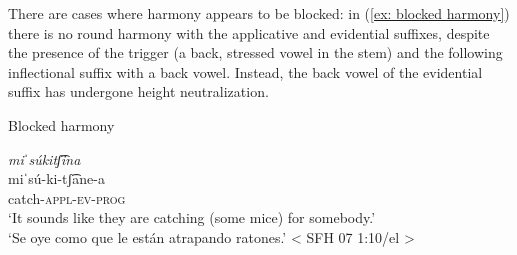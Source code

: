                 \label{ex: round harmony in derived stem and syntactic stemd}
                    \label{ex: round harmony in derived stem and syntactic steme}
    \z
\z

There are cases where harmony appears to be blocked: in (\ref{ex: blocked harmony}) there is no round harmony with the applicative and evidential suffixes, despite the presence of the trigger (a back, stressed vowel in the stem) and the following inflectional suffix with a back vowel. Instead, the back vowel of the evidential suffix has undergone height neutralization.

\ea\label{ex: blocked harmony}
{Blocked harmony}

    \textit{miˈsúkitʃ͡ina}\\
    \gll   miˈsú-ki-tʃ͡ane-a\\
             catch-\textsc{appl-ev-prog}\\
    \glt    ‘It sounds like they are catching (some mice) for somebody.’\\
    \glt    ‘Se oye como que le están atrapando ratones.' < SFH 07 1:10/el >\\
\z

